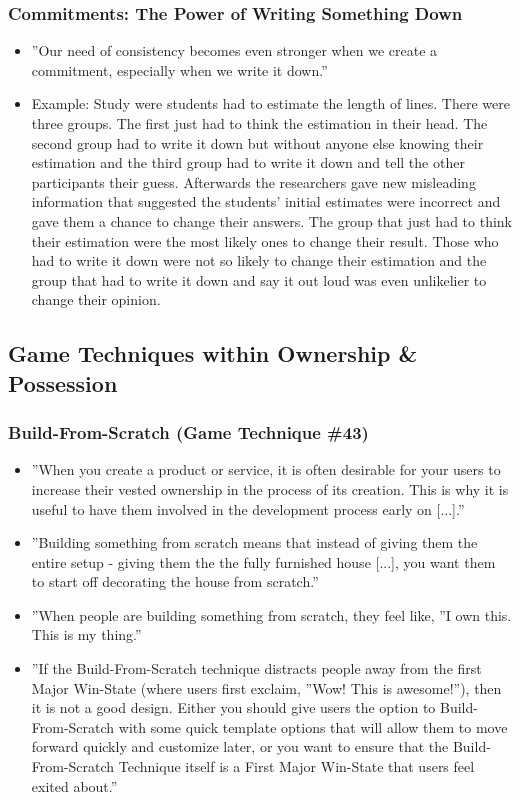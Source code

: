 \subsubsection{Commitments: The Power of Writing Something Down}
\begin{itemize}
    \item ''Our need of consistency becomes even stronger when we create a commitment, especially when we write it down.''
    \item Example: Study were students had to estimate the length of lines. There were three groups. The first just had to think the estimation in their head. The second group had to write it down but without anyone else knowing their estimation and the third group had to write it down and tell the other participants their guess. Afterwards the researchers gave new misleading information that suggested the students' initial estimates were incorrect and gave them a chance to change their answers. The group that just had to think their estimation were the most likely ones to change their result. Those who had to write it down were not so likely to change their estimation and the group that had to write it down and say it out loud was even unlikelier to change their opinion.
\end{itemize}

\subsection{Game Techniques within Ownership \& Possession}

\subsubsection{Build-From-Scratch (Game Technique \#43)}
    \begin{itemize}
        \item ''When you create a product or service, it is often desirable for your users to increase their vested ownership in the process of its creation. This is why it is useful to have them involved in the development process early on [...].''
        \item ''Building something from scratch means that instead of giving them the entire setup - giving them the the fully furnished house [...], you want them to start off decorating the house from scratch.''
        \item ''When people are building something from scratch, they feel like, ''I own this. This is my thing.''
        \item ''If the Build-From-Scratch technique distracts people away from the first Major Win-State (where users first exclaim, ''Wow! This is awesome!''), then it is not a good design. Either you should give users the option to Build-From-Scratch with some quick template options that will allow them to move forward  quickly and customize later, or you want to ensure that the Build-From-Scratch Technique itself is a First Major Win-State that users feel exited about.''
    \end{itemize}   
    
